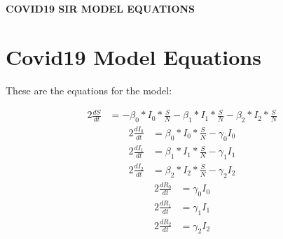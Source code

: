 \documentclass{article}%
\begin{document}
%
\normalsize%
\begin{center}%
\section*{}%
\label{sec:}%
\begin{Large}%
\textbf{COVID19 SIR MODEL EQUATIONS}%
\end{Large}

%
\end{center}%
\section{Covid19 Model Equations}%
\label{sec:Covid19ModelEquations}%
\begin{large}%
These are the equations for the model:%
\end{large}

%
\begin{alignat}{2}%
\frac{dS}{dt} &= -\beta_{0}*I_{0} * \frac{S}{N} -\beta_{1}*I_{1} * \frac{S}{N} -\beta_{2}*I_{2} * \frac{S}{N}%
\end{alignat}%
\begin{alignat}{2}%
\frac{dI_{0}}{dt} &= \beta_{0}*I_{0} * \frac{S}{N} -\gamma_{0}I_{0}%
\end{alignat}%
\begin{alignat}{2}%
\frac{dI_{1}}{dt} &= \beta_{1}*I_{1} * \frac{S}{N} -\gamma_{1}I_{1}%
\end{alignat}%
\begin{alignat}{2}%
\frac{dI_{2}}{dt} &= \beta_{2}*I_{2} * \frac{S}{N} -\gamma_{2}I_{2}%
\end{alignat}%
\begin{alignat}{2}%
\frac{dR_{0}}{dt} &= \gamma_{0}I_{0}%
\end{alignat}%
\begin{alignat}{2}%
\frac{dR_{1}}{dt} &= \gamma_{1}I_{1}%
\end{alignat}%
\begin{alignat}{2}%
\frac{dR_{2}}{dt} &= \gamma_{2}I_{2}%
\end{alignat}%
\end{document}
